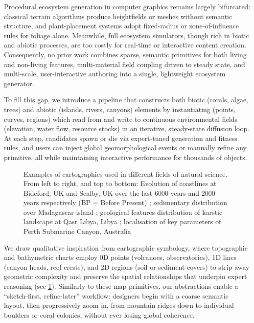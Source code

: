 Procedural ecosystem generation in computer graphics remains largely bifurcated: classical terrain algorithms produce heightfields or meshes without semantic structure, and plant-placement systems adopt fixed-radius or zone-of-influence rules for foliage alone. Meanwhile, full ecosystem simulators, though rich in biotic and abiotic processes, are too costly for real-time or interactive content creation. Consequently, no prior work combines sparse, semantic primitives for both living and non-living features, multi-material field coupling driven to steady state, and multi-scale, user-interactive authoring into a single, lightweight ecosystem generator.

To fill this gap, we introduce a pipeline that constructs both biotic (corals, algae, trees) and abiotic (islands, rivers, canyons) elements by instantiating  (points, curves, regions) which read from and write to continuous environmental fields (elevation, water flow, resource stocks) in an iterative, steady-state diffusion loop. At each step,  candidates spawn or die via expert-tuned generation and fitness rules, and users can inject global geomorphological events or manually refine any primitive, all while maintaining interactive performance for thousands of objects.


\begin{figure}
    \caption{Examples of cartographies used in different fields of natural science. From left to right, and top to bottom: Evolution of coastlines at Bideford, UK and Scalby, UK over the last 6000 years and 2000 years respectively (BP = Before Present) \cite{Shadrick2022}; sedimentary distribution over Madagascar island \cite{Pratt2017}; geological features distribution of karstic landscape at Qasr Libya, Libya \cite{ElAmawy2009}; localisation of key parameters of Perth Submarine Canyon, Australia \cite{Huang2014}}
    \label{fig:env-obj-symbolics-on-maps}
\end{figure}

We draw qualitative inspiration from cartographic symbology, where topographic and bathymetric charts employ 0D points (volcanoes, observatories), 1D lines (canyon heads, reef crests), and 2D regions (soil or sediment covers) to strip away geometric complexity and preserve the spatial relationships that underpin expert reasoning (see \cref{fig:env-obj-symbolics-on-maps}). Similarly to these map primitives, our  abstractions enable a “sketch-first, refine-later” workflow: designers begin with a coarse semantic layout, then progressively zoom in, from mountain ridges down to individual boulders or coral colonies, without ever losing global coherence.

